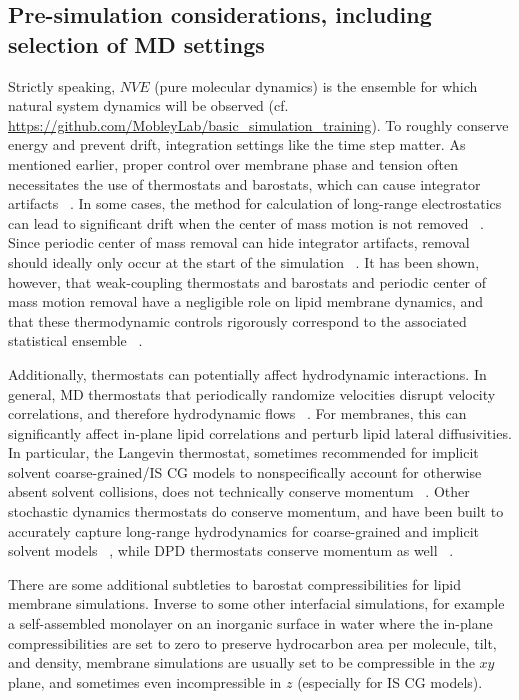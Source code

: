\documentclass[9pt,bestpractices,pubversion]{livecoms}
\begin{document}
\subsection{Pre-simulation considerations, including selection of MD settings}
\label{subsec:presim4}

Strictly speaking, $NVE$ (pure molecular dynamics) is the ensemble for which natural system dynamics will be observed (cf. \url{https://github.com/MobleyLab/basic_simulation_training}).
To roughly conserve energy and prevent drift, integration settings like the time step matter.
As mentioned earlier, proper control over membrane phase and tension often necessitates the use of thermostats and barostats, which can cause integrator artifacts ~\cite{Zgorski2016}.
In some cases, the method for calculation of long-range electrostatics can lead to significant drift when the center of mass motion is not removed ~\cite{Zgorski2016}.
Since periodic center of mass removal can hide integrator artifacts, removal should ideally only occur at the start of the simulation ~\cite{Zgorski2016}.
It has been shown, however, that weak-coupling thermostats and barostats and periodic center of mass motion removal have a negligible role on lipid membrane dynamics, and that these thermodynamic controls rigorously correspond to the associated statistical ensemble ~\cite{Venable2017}.

Additionally, thermostats can potentially affect hydrodynamic interactions.
In general, MD thermostats that periodically randomize velocities disrupt velocity correlations, and therefore hydrodynamic flows ~\cite{Zgorski2016}.
For membranes, this can significantly affect in-plane lipid correlations and perturb lipid lateral diffusivities.
In particular, the Langevin thermostat, sometimes recommended for implicit solvent coarse-grained/IS CG models to nonspecifically account for otherwise absent solvent collisions, does not technically conserve momentum ~\cite{Goga2012}.
Other stochastic dynamics thermostats do conserve momentum, and have been built to accurately capture long-range hydrodynamics for coarse-grained and implicit solvent models ~\cite{Zgorski2016,Wang2013}, while DPD thermostats conserve momentum as well ~\cite{Soddemann2003}.

There are some additional subtleties to barostat compressibilities for lipid membrane simulations.
Inverse to some other interfacial simulations, for example a self-assembled monolayer on an inorganic surface in water where the in-plane compressibilities are set to zero to preserve hydrocarbon area per molecule, tilt, and density, membrane simulations are usually set to be compressible in the $xy$ plane, and sometimes even incompressible in $z$ (especially for IS CG models).
\end{document}
